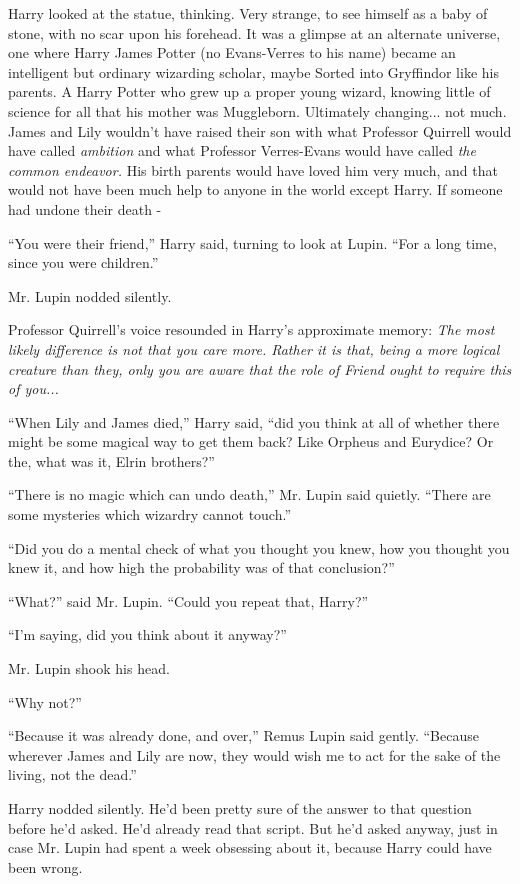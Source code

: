 Harry looked at the statue, thinking. Very strange, to see himself as a baby of stone, with no scar upon his forehead. It was a glimpse at an alternate universe, one where Harry James Potter (no Evans-Verres to his name) became an intelligent but ordinary wizarding scholar, maybe Sorted into Gryffindor like his parents. A Harry Potter who grew up a proper young wizard, knowing little of science for all that his mother was Muggleborn. Ultimately changing... not much. James and Lily wouldn't have raised their son with what Professor Quirrell would have called \emph{ambition} and what Professor Verres-Evans would have called \emph{the common endeavor.} His birth parents would have loved him very much, and that would not have been much help to anyone in the world except Harry. If someone had undone their death -

``You were their friend,'' Harry said, turning to look at Lupin. ``For a long time, since you were children.''

Mr. Lupin nodded silently.

Professor Quirrell's voice resounded in Harry's approximate memory: \emph{The most likely difference is not that you care more. Rather it is that, being a more logical creature than they, only you are aware that the role of Friend ought to require this of you...}

``When Lily and James died,'' Harry said, ``did you think at all of whether there might be some magical way to get them back? Like Orpheus and Eurydice? Or the, what was it, Elrin brothers?''

``There is no magic which can undo death,'' Mr. Lupin said quietly. ``There are some mysteries which wizardry cannot touch.''

``Did you do a mental check of what you thought you knew, how you thought you knew it, and how high the probability was of that conclusion?''

``What?'' said Mr. Lupin. ``Could you repeat that, Harry?''

``I'm saying, did you think about it anyway?''

Mr. Lupin shook his head.

``Why not?''

``Because it was already done, and over,'' Remus Lupin said gently. ``Because wherever James and Lily are now, they would wish me to act for the sake of the living, not the dead.''

Harry nodded silently. He'd been pretty sure of the answer to that question before he'd asked. He'd already read that script. But he'd asked anyway, just in case Mr. Lupin had spent a week obsessing about it, because Harry could have been wrong.

